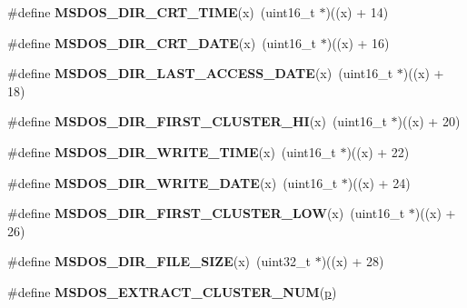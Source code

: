 \begin{DoxyCompactItemize}
\item 
\mbox{\label{group__libfs__msdos_gaf43a4d2b8be38f25379c784fc7053f5b}} 
\#define {\bfseries M\+S\+D\+O\+S\+\_\+\+D\+I\+R\+\_\+\+C\+R\+T\+\_\+\+T\+I\+ME}(x)~(uint16\+\_\+t $\ast$)((x) + 14)
\item 
\mbox{\label{group__libfs__msdos_ga4ed6ae43d5ed2b7dc7f8efc8dca1d391}} 
\#define {\bfseries M\+S\+D\+O\+S\+\_\+\+D\+I\+R\+\_\+\+C\+R\+T\+\_\+\+D\+A\+TE}(x)~(uint16\+\_\+t $\ast$)((x) + 16)
\item 
\mbox{\label{group__libfs__msdos_gaa9497c6001bdca68e888a10cb5211580}} 
\#define {\bfseries M\+S\+D\+O\+S\+\_\+\+D\+I\+R\+\_\+\+L\+A\+S\+T\+\_\+\+A\+C\+C\+E\+S\+S\+\_\+\+D\+A\+TE}(x)~(uint16\+\_\+t $\ast$)((x) + 18)
\item 
\mbox{\label{group__libfs__msdos_ga628068a195851e87dae00cb22ae42910}} 
\#define {\bfseries M\+S\+D\+O\+S\+\_\+\+D\+I\+R\+\_\+\+F\+I\+R\+S\+T\+\_\+\+C\+L\+U\+S\+T\+E\+R\+\_\+\+HI}(x)~(uint16\+\_\+t $\ast$)((x) + 20)
\item 
\mbox{\label{group__libfs__msdos_ga6f7f7f9d2fb2b244a57cc83b2275bccf}} 
\#define {\bfseries M\+S\+D\+O\+S\+\_\+\+D\+I\+R\+\_\+\+W\+R\+I\+T\+E\+\_\+\+T\+I\+ME}(x)~(uint16\+\_\+t $\ast$)((x) + 22)
\item 
\mbox{\label{group__libfs__msdos_ga66584b5c68469200620486f34c2211c3}} 
\#define {\bfseries M\+S\+D\+O\+S\+\_\+\+D\+I\+R\+\_\+\+W\+R\+I\+T\+E\+\_\+\+D\+A\+TE}(x)~(uint16\+\_\+t $\ast$)((x) + 24)
\item 
\mbox{\label{group__libfs__msdos_ga7113cd28188d2a5acff439b2127715d4}} 
\#define {\bfseries M\+S\+D\+O\+S\+\_\+\+D\+I\+R\+\_\+\+F\+I\+R\+S\+T\+\_\+\+C\+L\+U\+S\+T\+E\+R\+\_\+\+L\+OW}(x)~(uint16\+\_\+t $\ast$)((x) + 26)
\item 
\mbox{\label{group__libfs__msdos_ga4877020a5e4cb5c8314d5309b3482fbb}} 
\#define {\bfseries M\+S\+D\+O\+S\+\_\+\+D\+I\+R\+\_\+\+F\+I\+L\+E\+\_\+\+S\+I\+ZE}(x)~(uint32\+\_\+t $\ast$)((x) + 28)
\item 
\#define {\bfseries M\+S\+D\+O\+S\+\_\+\+E\+X\+T\+R\+A\+C\+T\+\_\+\+C\+L\+U\+S\+T\+E\+R\+\_\+\+N\+UM}(\mbox{\hyperlink{sun4u_2tte_8h_a27952ffc298d15b4fc0e7ee6b2a044ac}{p}})

\end{DoxyCompactItemize}

